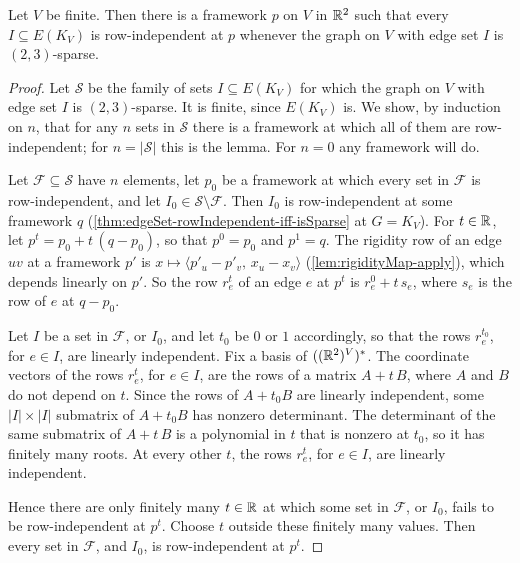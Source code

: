\begin{lemma}
  \label{lem:exists-uniform-rowIndependent-placement}
  \leanok
  Let $V$ be finite. Then there is a framework $p$ on $V$ in ${\mathbb{R}}^{2}$
  such that every $I \subseteq E(K_V)$ is row-independent at $p$
  whenever the graph on $V$ with edge set $I$ is $(2, 3)$-sparse.
\end{lemma}
\begin{proof}
  \leanok
  Let $\mathcal{S}$ be the family of sets $I \subseteq E(K_V)$ for
  which the graph on $V$ with edge set $I$ is $(2, 3)$-sparse. It is
  finite, since $E(K_V)$ is. We show, by induction on $n$, that for any
  $n$ sets in $\mathcal{S}$ there is a framework at which all of them
  are row-independent; for $n = |\mathcal{S}|$ this is the lemma. For
  $n = 0$ any framework will do.

  Let $\mathcal{F} \subseteq \mathcal{S}$ have $n$ elements, let $p_0$
  be a framework at which every set in $\mathcal{F}$ is row-independent,
  and let $I_0 \in \mathcal{S} \setminus \mathcal{F}$. Then $I_0$ is
  row-independent at some framework $q$
  (\cref{thm:edgeSet-rowIndependent-iff-isSparse} at $G = K_V$). For
  $t \in {\mathbb{R}}$, let $p^{t} = p_0 + t\,(q - p_0)$, so that $p^{0} = p_0$
  and $p^{1} = q$. The rigidity row of an edge $uv$ at a framework $p'$
  is $x \mapsto \langle p'_u - p'_v,\, x_u - x_v \rangle$
  (\cref{lem:rigidityMap-apply}), which depends linearly on $p'$. So the
  row $r^{t}_e$ of an edge $e$ at $p^{t}$ is $r^{0}_e + t\,s_e$, where
  $s_e$ is the row of $e$ at $q - p_0$.

  Let $I$ be a set in $\mathcal{F}$, or $I_0$, and let $t_0$ be $0$ or
  $1$ accordingly, so that the rows $r^{t_0}_e$, for $e \in I$, are
  linearly independent. Fix a basis of $(({\mathbb{R}}^{2})^{V})^{*}$. The
  coordinate vectors of the rows $r^{t}_e$, for $e \in I$, are the rows
  of a matrix $A + t\,B$, where $A$ and $B$ do not depend on $t$. Since
  the rows of $A + t_0 B$ are linearly independent, some
  $|I| \times |I|$ submatrix of $A + t_0 B$ has nonzero determinant. The
  determinant of the same submatrix of $A + t\,B$ is a polynomial in $t$
  that is nonzero at $t_0$, so it has finitely many roots. At every
  other $t$, the rows $r^{t}_e$, for $e \in I$, are linearly independent.

  Hence there are only finitely many $t \in {\mathbb{R}}$ at which some set in
  $\mathcal{F}$, or $I_0$, fails to be row-independent at $p^{t}$.
  Choose $t$ outside these finitely many values. Then every set in
  $\mathcal{F}$, and $I_0$, is row-independent at $p^{t}$.
\end{proof}

